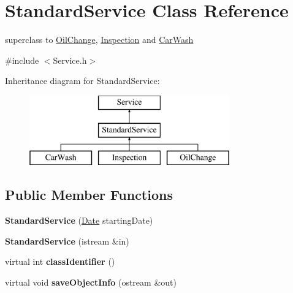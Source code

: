 \hypertarget{class_standard_service}{}\section{Standard\+Service Class Reference}
\label{class_standard_service}


superclass to \hyperlink{class_oil_change}{Oil\+Change}, \hyperlink{class_inspection}{Inspection} and \hyperlink{class_car_wash}{Car\+Wash}  




{\ttfamily \#include $<$Service.\+h$>$}

Inheritance diagram for Standard\+Service\+:\begin{figure}[H]
\begin{center}
\leavevmode
\includegraphics[height=3.000000cm]{class_standard_service}
\end{center}
\end{figure}
\subsection*{Public Member Functions}
\begin{DoxyCompactItemize}
\item 
\hypertarget{class_standard_service_aa5adb06b6c2253879530879fe38b8f92}{}{\bfseries Standard\+Service} (\hyperlink{struct_date}{Date} starting\+Date)\label{class_standard_service_aa5adb06b6c2253879530879fe38b8f92}

\item 
\hypertarget{class_standard_service_a0ab11433e170d74a684c50c21b6d35cf}{}{\bfseries Standard\+Service} (istream \&in)\label{class_standard_service_a0ab11433e170d74a684c50c21b6d35cf}

\item 
\hypertarget{class_standard_service_ae5b28b6a444f0bf5a60a7acd030a1368}{}virtual int {\bfseries class\+Identifier} ()\label{class_standard_service_ae5b28b6a444f0bf5a60a7acd030a1368}

\item 
\hypertarget{class_standard_service_a7fcb88363b52004585e7f3548b864927}{}virtual void {\bfseries save\+Object\+Info} (ostream \&out)\label{class_standard_service_a7fcb88363b52004585e7f3548b864927}

\end{DoxyCompactItemize}
